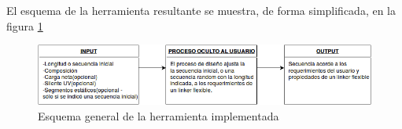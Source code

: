 El esquema de la herramienta resultante se muestra, de forma simplificada, en la figura \ref{diagram}

\begin{figure}[h!]
\centering
   \includegraphics[width=\textwidth]{img/diagram.png}
 \caption{Esquema general de la herramienta implementada}
 \label{diagram}
\end{figure}

